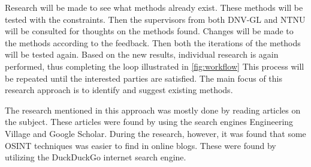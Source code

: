 Research will be made to see what methods already exist. These methods will be tested with the constraints. Then the supervisors from both DNV-GL and NTNU will be consulted for thoughts on the methods found. Changes will be made to the methods according to the feedback. Then both the iterations of the methods will be tested again. Based on the new results, individual research is again performed, thus completing the loop illustrated in \cref{fig:workflow} This process will be repeated until the interested parties are satisfied. 
The main focus of this research approach is to identify and suggest existing methods.

The research mentioned in this approach was mostly done by reading articles on the subject. These articles were found by using the search engines Engineering Village\cite{engineering_village} and Google Scholar\cite{google_scholar}. During the research, however, it was found that some OSINT techniques was easier to find in online blogs. These were found by utilizing the DuckDuckGo internet search engine\cite{ddg}. 


 
